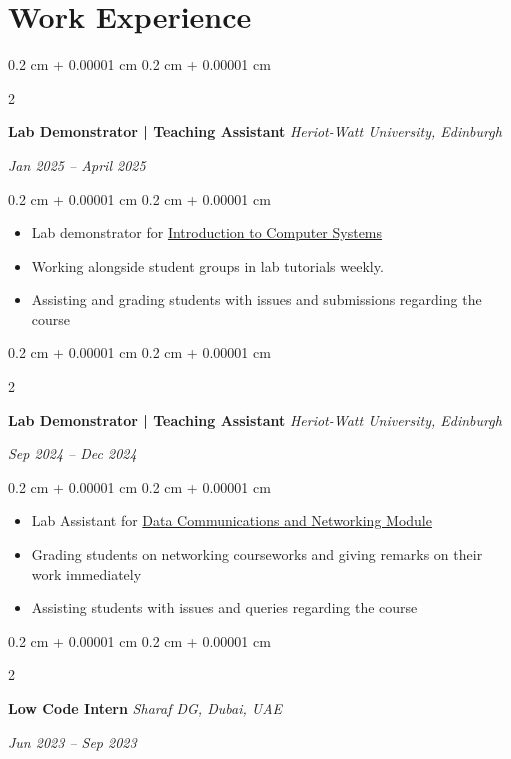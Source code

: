 \documentclass[10pt, letterpaper]{article}
\newenvironment{highlights}{
    \begin{itemize}[
        topsep=0.10 cm,
        parsep=0.10 cm,
        partopsep=0pt,
        itemsep=0pt,
        leftmargin=0.4 cm + 10pt
    ]
}{
    \end{itemize}
} %
\newenvironment{onecolentry}{
    \begin{adjustwidth}{
        0.2 cm + 0.00001 cm
    }{
        0.2 cm + 0.00001 cm
    }
}{
    \end{adjustwidth}
} %
\newenvironment{twocolentry}[2][]{
    \onecolentry
    \def\secondColumn{#2}
    \setcolumnwidth{\fill, 4.5 cm}
    \begin{paracol}{2}
}{
    \switchcolumn \raggedleft \secondColumn
    \end{paracol}
    \endonecolentry
} %
\begin{document}
    \section{Work Experience}
        \begin{twocolentry}{
        \textit{Jan 2025 – April 2025}}
        \textbf{Lab Demonstrator | Teaching Assistant}
        \textit{Heriot-Watt University, Edinburgh}
    \end{twocolentry}
    \vspace{0.10 cm}
    \begin{onecolentry}
        \begin{highlights}
            \item Lab demonstrator for \underline{Introduction to Computer Systems}
            \item Working alongside student groups in lab tutorials weekly.
            \item Assisting and grading students with issues and submissions regarding the course
        \end{highlights}
    \end{onecolentry}
    \begin{twocolentry}{
        \textit{Sep 2024 – Dec 2024}}
        \textbf{Lab Demonstrator | Teaching Assistant}
        \textit{Heriot-Watt University, Edinburgh}
    \end{twocolentry}
    \vspace{0.10 cm}
    \begin{onecolentry}
        \begin{highlights}
            \item Lab Assistant for \underline{Data Communications and Networking Module}
            \item Grading students on networking courseworks and giving remarks on their work immediately
            \item Assisting students with issues and queries regarding the course
        \end{highlights}
    \end{onecolentry}
        \vspace{0.2 cm}
    \begin{twocolentry}{
        \textit{Jun 2023 – Sep 2023}}
        \textbf{Low Code Intern}
        \textit{Sharaf DG, Dubai, UAE}
    \end{twocolentry}
    \vspace{0.10 cm}
\end{document}
